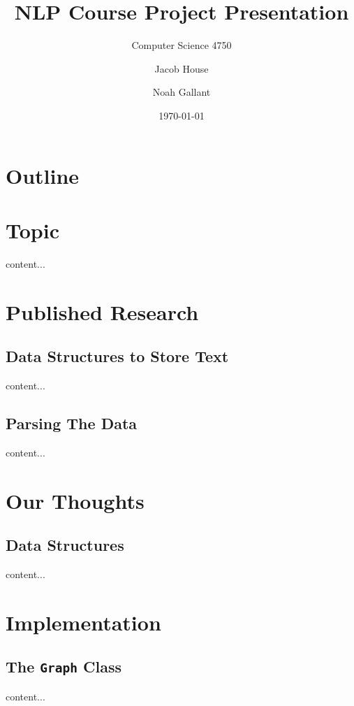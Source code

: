 \documentclass[xcolor={usenames,dvipsnames,svgnames}]{beamer}
\title{NLP Course Project Presentation}
\subtitle{Computer Science 4750}
\author{Jacob House \and Noah Gallant}
\date{\today}
\begin{document}
\maketitle

\section*{Outline}
\begin{frame}
	\tableofcontents
\end{frame}

\section{Topic}
\begin{frame}
content...
\end{frame}

\section{Published Research}
\subsection{Data Structures to Store Text}
\begin{frame}
content...
\end{frame}

\subsection{Parsing The Data}
\begin{frame}
content...
\end{frame}

\section{Our Thoughts}
\subsection{Data Structures}
\begin{frame}
content...
\end{frame}

\section{Implementation}
\subsection{The {\tt Graph} Class}
\begin{frame}
content...
\end{frame}
\end{document}
